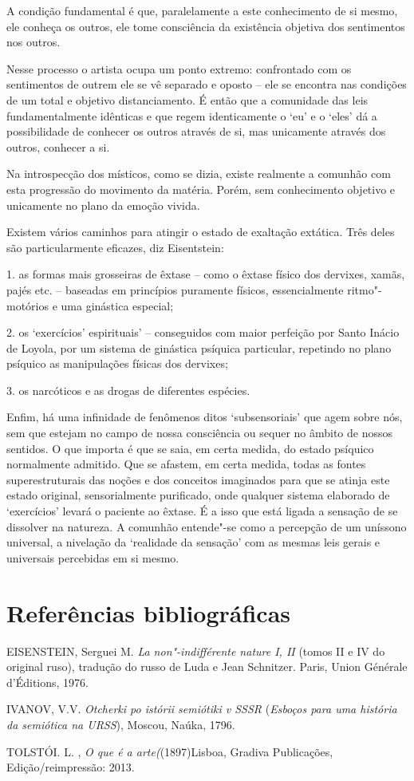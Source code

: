 A condição fundamental é que, paralelamente a este conhecimento de si
mesmo, ele conheça os outros, ele tome consciência da existência
objetiva dos sentimentos nos outros.

Nesse processo o artista ocupa um ponto extremo: confrontado com os
sentimentos de outrem ele se vê separado e oposto -- ele se encontra nas
condições de um total e objetivo distanciamento. É então que a
comunidade das leis fundamentalmente idênticas e que regem identicamente
o `eu' e o `eles' dá a possibilidade de conhecer os outros através de
si, mas unicamente através dos outros, conhecer a si.

Na introspecção dos místicos, como se dizia, existe realmente a comunhão
com esta progressão do movimento da matéria. Porém, sem conhecimento
objetivo e unicamente no plano da emoção vivida.

Existem vários caminhos para atingir o estado de exaltação extática.
Três deles são particularmente eficazes, diz Eisentstein:

1. as formas mais grosseiras de êxtase -- como o êxtase físico dos
dervixes, xamãs, pajés etc. -- baseadas em princípios puramente físicos,
essencialmente ritmo"-motórios e uma ginástica especial;

2. os `exercícios' espirituais' -- conseguidos com maior perfeição por
Santo Inácio de Loyola, por um sistema de ginástica psíquica particular,
repetindo no plano psíquico as manipulações físicas dos dervixes;

3. os narcóticos e as drogas de diferentes espécies.

Enfim, há uma infinidade de fenômenos ditos `subsensoriais' que agem
sobre nós, sem que estejam no campo de nossa consciência ou sequer no
âmbito de nossos sentidos. O que importa é que se saia, em certa medida,
do estado psíquico normalmente admitido. Que se afastem, em certa
medida, todas as fontes superestruturais das noções e dos conceitos
imaginados para que se atinja este estado original, sensorialmente
purificado, onde qualquer sistema elaborado de `exercícios' levará o
paciente ao êxtase. É a isso que está ligada a sensação de se dissolver
na natureza. A comunhão entende"-se como a percepção de um uníssono
universal, a nivelação da `realidade da sensação' com as mesmas leis
gerais e universais percebidas em si mesmo.

\section{Referências bibliográficas}

EISENSTEIN, Serguei M. \emph{La non"-indifférente nature I, II} (tomos II
e IV do original ruso), tradução do russo de Luda e Jean Schnitzer.
Paris, Union Générale d'Éditions, 1976.

IVANOV, V.V. \emph{Otcherki po istórii semiótiki v SSSR} (\emph{Esboços
para uma história da semiótica na URSS}), Moscou, Naúka, 1796.

TOLSTÓI. L. , \emph{O que é a arte(}(1897)Lisboa, Gradiva Publicações,
Edição/reimpressão: 2013.
